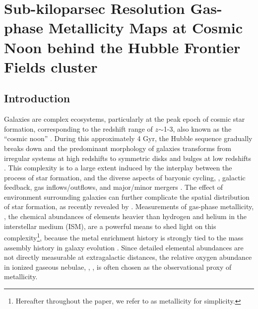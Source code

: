 
\chapter{Sub-kiloparsec Resolution Gas-phase Metallicity Maps at Cosmic Noon behind the Hubble Frontier Fields
cluster \clyi}

\section{Introduction}\label{sect:intro}

Galaxies are complex ecosystems, particularly at the peak epoch of cosmic star formation,
corresponding to the redshift range of $z$$\sim$1-3, also known as the ``cosmic noon''
\citep[see][for a recent review]{2014ARA&A..52..415M}.  During this approximately 4 Gyr, the
Hubble sequence gradually breaks down and the predominant morphology of galaxies transforms
from irregular systems at high redshifts to symmetric disks and bulges at low redshifts
\citep{Mortlock:2013dg}.  This complexity is to a large extent induced by the interplay
between the process of star formation, and the diverse aspects of baryonic cycling, \eg,
galactic feedback, gas inflows/outflows, and major/minor mergers
\citep{2011MNRAS.415...11D,Martin:2012dx}.  The effect of environment surrounding galaxies
can further complicate the spatial distribution of star formation, as recently revealed by
\citet{2015ApJ...814..161V,TheGrismlensampli:-R7Qg0z6}.
Measurements of gas-phase metallicity, \ie, the chemical abundances of elements heavier than
hydrogen and helium in the interstellar medium (ISM), are a powerful means to shed light on
this complexity\footnote{Hereafter throughout the paper, we refer to \gpm as metallicity for
simplicity.}, because the metal enrichment history is strongly tied to the mass assembly history in galaxy evolution
\citep{2011MNRAS.416.1354D,Lu:2015ic}.  Since detailed elemental abundances are not directly measurable at extragalactic
distances, the relative oxygen abundance in ionized gaseous nebulae, \ie, \oh, is often chosen as the observational proxy of
metallicity.


